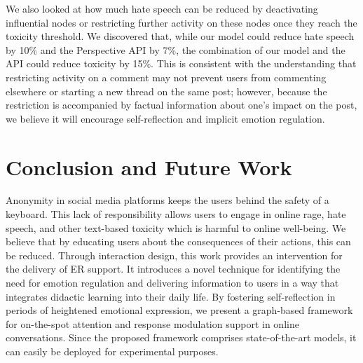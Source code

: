 \documentclass[acmtog]{acmart}
\begin{document}
We also looked at how much hate speech can be reduced by deactivating influential nodes or restricting further activity on these nodes once they reach the toxicity threshold. We discovered that, while our model could reduce hate speech by 10\% and the Perspective API by 7\%, the combination of our model and the API could reduce toxicity by 15\%. This is consistent with the understanding that restricting activity on a comment may not prevent users from commenting elsewhere or starting a new thread on the same post; however, because the restriction is accompanied by factual information about one's impact on the post, we believe it will encourage self-reflection and implicit emotion regulation.












\section{Conclusion and Future Work}
Anonymity in social media platforms keeps the users behind the safety of a keyboard. This lack of responsibility allows users to engage in online rage, hate speech, and other text-based toxicity which is harmful to online well-being. We believe that by educating users about the consequences of their actions, this can be reduced. Through interaction design, this work provides an intervention for the delivery of ER support. It introduces a novel technique for identifying the need for emotion regulation and delivering information to users in a way that integrates didactic learning into their daily life. By fostering self-reflection in periods of heightened emotional expression, we present a graph-based framework for on-the-spot attention and response modulation support in online conversations. Since the proposed framework comprises state-of-the-art models, it can easily be deployed for experimental purposes. 



\end{document}
